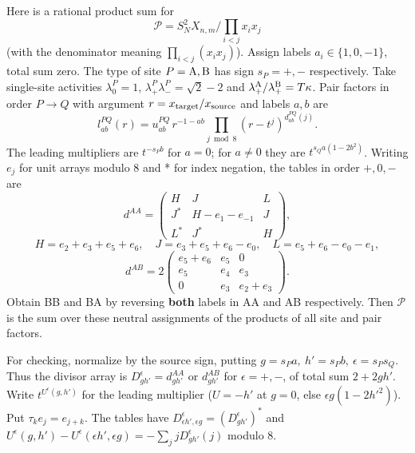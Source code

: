 Here is a rational product sum for
\[
 \mathcal P=S_N^2 X_{n,m}/\prod_{i<j}x_i x_j
\]
(with the denominator meaning \(\prod_{i<j}(x_i x_j)\)). Assign labels \(a_i\in\{1,0,-1\}\), total sum zero. The type of site \(P={\rm A},{\rm B}\) has sign \(s_P=+,-\) respectively. Take single-site activities \(\lambda_0^P=1\), \(\lambda_+^P\lambda_-^P=\sqrt2-2\) and \(\lambda_+^{\rm A}/\lambda_+^{\rm B}=T\kappa\). Pair factors in order \(P\to Q\) with argument \(r=x_{\rm target}/x_{\rm source}\) and labels \(a,b\) are
\[
 l^{PQ}_{ab}(r)=u^{PQ}_{ab}\,r^{-1-ab}\prod_{j\bmod8}(r-t^j)^{d^{PQ}_{ab}(j)} .
\]
The leading multipliers are \(t^{-s_P b}\) for \(a=0\); for \(a\ne0\) they are \(t^{s_Q a(1-2 b^2)}\). Writing \(e_j\) for unit arrays modulo 8 and * for index negation, the tables in order \(+,0,-\) are
\[
 d^{AA}=\begin{pmatrix}H&J&L\\J^*&H-e_1-e_{-1}&J\\ L^*&J^*&H\end{pmatrix},
\]
\[
 H=e_2+e_3+e_5+e_6,\quad J=e_3+e_5+e_6-e_0,\quad L=e_5+e_6-e_0-e_1,
\]
\[
 d^{AB}=2\begin{pmatrix} e_5+e_6&e_5&0\\e_5&e_4&e_3\\0&e_3&e_2+e_3\end{pmatrix}.
\]
Obtain BB and BA by reversing \textbf{both} labels in AA and AB respectively. Then \(\mathcal P\) is the sum over these neutral assignments of the products of all site and pair factors.

For checking, normalize by the source sign, putting \(g=s_P a,\ h'=s_P b,\ \epsilon=s_P s_Q\). Thus the divisor array is \(D^\epsilon_{g h'}=d^{AA}_{g h'}\) or \(d^{AB}_{g h'}\) for \(\epsilon=+,-\), of total sum \(2+2gh'\). Write \(t^{U^\epsilon(g,h')}\) for the leading multiplier (\(U=-h'\) at \(g=0\), else \(\epsilon g(1-2h'^2)\)). Put \(\tau_k e_j=e_{j+k}\). The tables have \(D^\epsilon_{\epsilon h',\epsilon g}=(D^\epsilon_{g h'})^*\) and \(U^\epsilon(g,h')-U^\epsilon(\epsilon h',\epsilon g)=-\sum_j j D^\epsilon_{g h'}(j)\) modulo 8.

